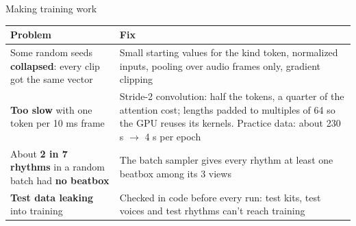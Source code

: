 \begin{frame}{Making training work}

  \small
  \begin{tabular}{@{}p{}p{}@{}}
    \toprule
    Problem & Fix \\
    \midrule
    Some random seeds \textbf{collapsed}: every clip got the same vector
      & Small starting values for the kind token, normalized inputs, pooling over audio
        frames only, gradient clipping \\
    \addlinespace
    \textbf{Too slow} with one token per 10 ms frame
      & Stride-2 convolution: half the tokens, a quarter of the attention cost; lengths
        padded to multiples of 64 so the GPU reuses its kernels.
        Practice data: about 230 s $\rightarrow$ 4 s per epoch \\
    \addlinespace
    About \textbf{2 in 7 rhythms} in a random batch had \textbf{no beatbox}
      & The batch sampler gives every rhythm at least one beatbox among its 3 views \\
    \addlinespace
    \textbf{Test data leaking} into training
      & Checked in code before every run: test kits, test voices and test rhythms
        can't reach training \\
    \bottomrule
  \end{tabular}

\end{frame}
